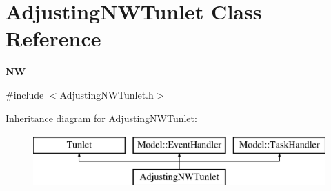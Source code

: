 \hypertarget{class_adjusting_n_w_tunlet}{\section{Adjusting\-N\-W\-Tunlet Class Reference}
\label{class_adjusting_n_w_tunlet}
}


{\bfseries N\-W}  




{\ttfamily \#include $<$Adjusting\-N\-W\-Tunlet.\-h$>$}

Inheritance diagram for Adjusting\-N\-W\-Tunlet\-:\begin{figure}[H]
\begin{center}
\leavevmode
\includegraphics[height=2.000000cm]{class_adjusting_n_w_tunlet}
\end{center}
\end{figure}
